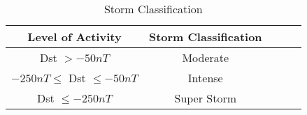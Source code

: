 	\begin{table}[h]
		\centering
		\caption{Storm Classification}
		\label{table:stormclass}
		\begin{tabular}{ccccc}
		\hline
		Level of Activity & Storm Classification \\ \hline
		Dst $> -50 nT$ & Moderate\\
		$-250 nT \leq $ Dst $\leq -50 nT$ & Intense\\
		Dst $\leq -250 nT$ & Super Storm\\ \hline
		\end{tabular}
	\end{table}


%
%